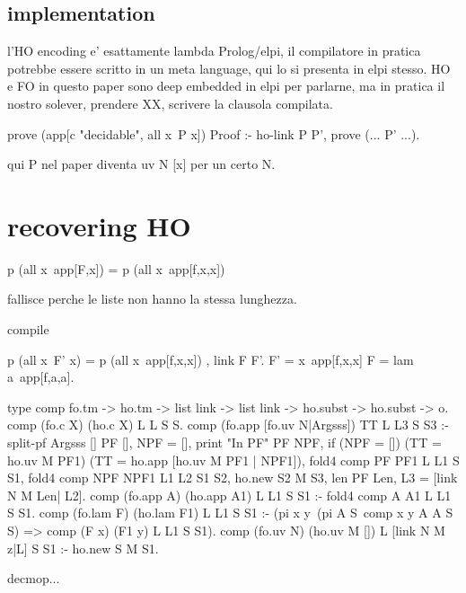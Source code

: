 \documentclass{rapport}
\begin{document}
\subsection{implementation}

l'HO encoding e' esattamente lambda Prolog/elpi, il compilatore
in pratica potrebbe essere scritto in un meta language, qui lo si presenta in
elpi stesso. HO e FO in questo paper sono deep embedded in elpi per parlarne,
ma in pratica il nostro solever, prendere XX, scrivere la clausola compilata.

\begin{elpicode}
prove (app[c "decidable", all x\ P x]) Proof :- ho-link P P', prove (... P' ...).
\end{elpicode}

qui P nel paper diventa uv N [x] per un certo N.

\section{recovering HO}

\begin{elpicode}
  p (all x\ app[F,x]) = p (all x\ app[f,x,x])
\end{elpicode}

fallisce perche le liste non hanno la stessa lunghezza.


compile

\begin{elpicode}
  p (all x\ F' x) = p (all x\ app[f,x,x]) , link F F'.
  F' = x\ app[f,x,x]
  F = lam a\ app[f,a,a].
\end{elpicode}

\begin{elpicode}
  type comp fo.tm -> ho.tm -> list link -> list link -> ho.subst -> ho.subst -> o.
  comp (fo.c X)   (ho.c X) L L S S.
  comp (fo.app [fo.uv N|Argsss]) TT L L3 S S3 :- %
    split-pf Argsss [] PF [], NPF = [], %
    print "In PF" PF NPF, 
    if (NPF = []) (TT = ho.uv M PF1) (TT = ho.app [ho.uv M PF1 | NPF1]),
    fold4 comp PF PF1 L L1 S S1,
    fold4 comp NPF NPF1 L1 L2 S1 S2,
    ho.new S2 M S3,
    len PF Len,
    L3 = [link N M Len| L2].
  comp (fo.app A) (ho.app A1) L L1 S S1 :- fold4 comp A A1 L L1 S S1.
  comp (fo.lam F) (ho.lam F1) L L1 S S1 :- 
    (pi x y\ (pi A S\ comp x y A A S S) => comp (F x) (F1 y) L L1 S S1).
  comp (fo.uv N) (ho.uv M []) L [link N M z|L] S S1 :- ho.new S M S1.

  decmop...
\end{elpicode}
\end{document}
